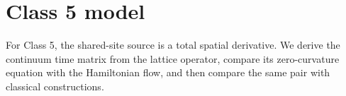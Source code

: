 \section{Class 5 model}
\label{sec:class5-model}

For Class 5, the shared-site source is a total spatial derivative.  We derive
the continuum time matrix from the lattice operator, compare its
zero-curvature equation with the Hamiltonian flow, and then compare the same
pair with classical constructions.






